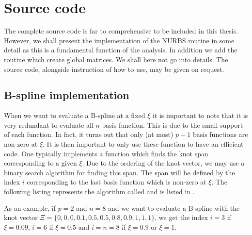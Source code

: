\section{Source code}
The complete source code is far to comprehensive to be included in this thesis. However, we shall present the implementation of the NURBS routine in some detail as this is a fundamental function of the analysis. In addition we add the routine which create global matrices. We shall here not go into details. The source code, alongside instruction of how to use, may be given on request.

\subsection{B-spline implementation}
When we want to evaluate a B-spline at a fixed $\xi$ it is important to note that it is very redundant to evaluate all $n$ basis function. This is due to the small support of each function. In fact, it turns out that only (at most) $p+1$ basis functions are non-zero at $\xi$. It is then important to only use these function to have an efficient code. One typically implements a function which finds the knot span corresponding to a given $\xi$. Due to the ordering of the knot vector, we may use a binary search algorithm for finding this span. The span will be defined by the index $i$ corresponding to the last basis function which is non-zero at $\xi$. The following listing represents the algorithm called  and is listed in .

As an example, if $p=2$ and $n=8$ and we want to evaluate a B-spline with the knot vector $\Xi = \{0, 0, 0, 0.1, 0.5, 0.5, 0.8, 0.9, 1, 1, 1\}$, we get the index $i=3$ if $\xi = 0.09$, $i=6$ if $\xi=0.5$ and $i=n=8$ if $\xi=0.9$ or $\xi = 1$.

